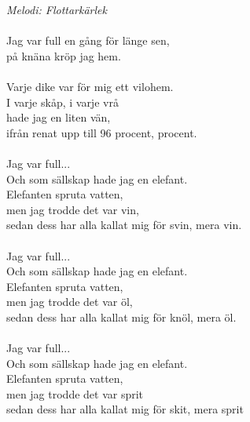 {\footnotesize\textit{Melodi: Flottarkärlek}}\\
\\
Jag var full en gång för länge sen,\\
på knäna kröp jag hem.\\
\\
Varje dike var för mig ett vilohem.\\
I varje skåp, i varje vrå\\
hade jag en liten vän,\\
ifrån renat upp till 96 procent, procent.\\
\\
Jag var full...\\
Och som sällskap hade jag en elefant.\\
Elefanten spruta vatten,\\
men jag trodde det var vin,\\
sedan dess har alla kallat mig för svin, mera vin.\\
\\
Jag var full...\\
Och som sällskap hade jag en elefant.\\
Elefanten spruta vatten,\\
men jag trodde det var öl,\\
sedan dess har alla kallat mig för knöl, mera öl.\\
\\
Jag var full...\\
Och som sällskap hade jag en elefant.\\
Elefanten spruta vatten,\\
men jag trodde det var sprit\\
sedan dess har alla kallat mig för skit, mera sprit
